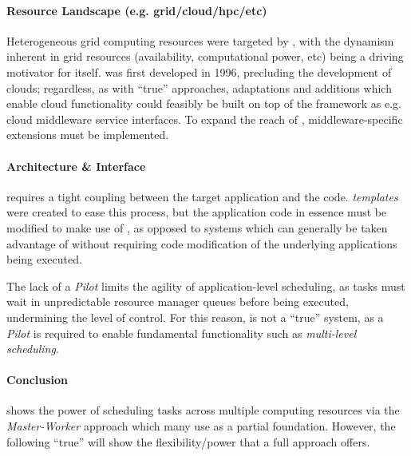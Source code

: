 \documentclass{sig-alternate}
\begin{document}
\paragraph{Resource Landscape (e.g. grid/cloud/hpc/etc)}
Heterogeneous grid computing resources were targeted by
\apples, with the dynamism inherent in grid resources (availability,
computational power, etc) being a driving 
motivator for \apples itself.  \apples
was first developed in 1996, precluding the development of clouds;
regardless, as with ``true'' \pilotjob approaches, adaptations
and additions which enable cloud functionality could
feasibly be built on top of the \apples framework as e.g.
cloud middleware service interfaces.
 To expand the reach of \apples, middleware-specific
extensions must be implemented.

\paragraph{Architecture \& Interface}
\apples requires a tight coupling between the target application
and the \apples code.  \textit{\apples templates} were created
to ease this process, but the application code in essence must
be modified to make use of \apples, as opposed to \pilotjob
systems which can generally be taken advantage of without
requiring code modification of the underlying applications being
executed.

The lack of a \textit{Pilot} limits the agility
of application-level scheduling, as tasks
must wait in unpredictable resource manager queues before being executed,
undermining the level of control.  For this reason, \apples
is not a ``true'' \pilotjob system, as a \textit{Pilot}
is required to enable fundamental \pilotjob functionality such as
\textit{multi-level scheduling}.

\paragraph{\apples Conclusion}
\apples shows the power of scheduling tasks across multiple computing resources
via the \textit{Master-Worker} approach which many
\pilotjobs use as a partial foundation.  However,
the following ``true'' \pilotjobs will show the flexibility/power
that a full \pilotjob approach offers.

\end{document}
